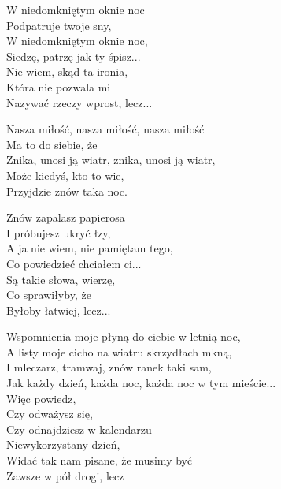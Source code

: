 \begin{text}
    W niedomkniętym oknie noc\\
    Podpatruje twoje sny,\\
    W niedomkniętym oknie noc,\\
    Siedzę, patrzę jak ty śpisz...\\
    Nie wiem, skąd ta ironia,\\
    Która nie pozwala mi\\
    Nazywać rzeczy wprost, lecz...

    \vin Nasza miłość, nasza miłość, nasza miłość\\
    \vin Ma to do siebie, że\\
    \vin Znika, unosi ją wiatr, znika, unosi ją wiatr,\\
    \vin Może kiedyś, kto to wie,\\
    \vin Przyjdzie znów taka noc.

    Znów zapalasz papierosa\\
    I próbujesz ukryć łzy,\\
    A ja nie wiem, nie pamiętam tego,\\
    Co powiedzieć chciałem ci...\\
    Są takie słowa, wierzę,\\
    Co sprawiłyby, że\\
    Byłoby łatwiej, lecz...

    Wspomnienia moje płyną do ciebie w letnią noc,\\
    A listy moje cicho na wiatru skrzydłach mkną,\\
    I mleczarz, tramwaj, znów ranek taki sam,\\
    Jak każdy dzień, każda noc, każda noc w tym mieście...\\
    \vin Więc powiedz,\\
    \vin Czy odważysz się,\\
    \vin Czy odnajdziesz w kalendarzu\\
    \vin Niewykorzystany dzień,\\
    \vin Widać tak nam pisane, że musimy być\\
    \vin Zawsze w pół drogi, lecz
\end{text}
\begin{chord}

\end{chord}